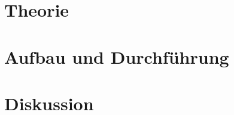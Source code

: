 \documentclass{scrartcl}
\begin{document}
\section{Theorie}

\section{Aufbau und Durchführung}

\section{Diskussion}
\end{document}
